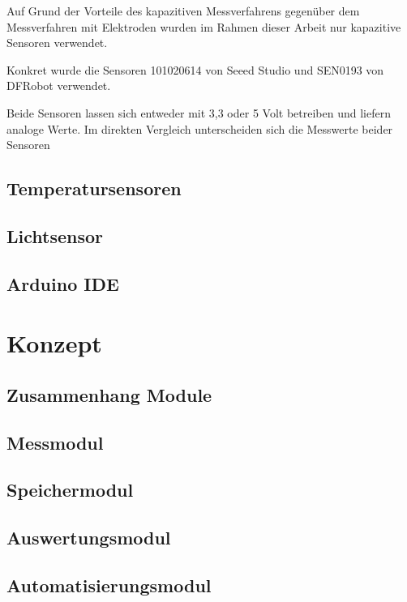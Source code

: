 \documentclass[
    load-dhbw-templates,
    load-preamble = true,
    auto-intro-pages = all,
    add-tocs-to-toc,
    debug = true,
    language = english,
    mainlanguage = ngerman,
    add-bibliography,
    bib-file = dhbw-source.bib,
    biblatex/style = alphabetic, 
]{iodhbwm}
\begin{document}
        Auf Grund der Vorteile des kapazitiven Messverfahrens gegenüber dem Messverfahren mit Elektroden wurden im Rahmen dieser Arbeit nur kapazitive Sensoren verwendet.


        Konkret wurde die Sensoren 101020614 von Seeed Studio und SEN0193 von DFRobot verwendet.


        Beide Sensoren lassen sich entweder mit 3,3 oder 5 Volt betreiben und liefern analoge Werte.
        Im direkten Vergleich unterscheiden sich die Messwerte beider Sensoren %
        
        \subsection{Temperatursensoren}
        \subsection{Lichtsensor}
        \subsection{Arduino IDE}
    \section{Konzept}
        \subsection{Zusammenhang Module}
        \subsection{Messmodul}
        \subsection{Speichermodul}
        \subsection{Auswertungsmodul}
        \subsection{Automatisierungsmodul}
\end{document}
